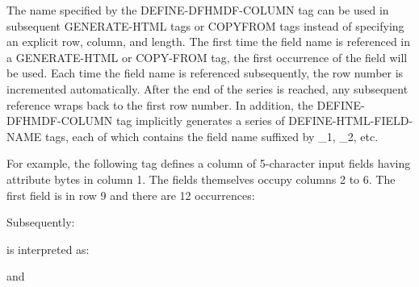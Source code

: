 \documentclass[letterpaper,10pt,english]{sphinxmanual}
\begin{document}
The name specified by the DEFINE-DFHMDF-COLUMN tag can be used in subsequent GENERATE-HTML tags or COPYFROM
tags instead of specifying an explicit row, column, and length. The first time the field name is referenced in a
GENERATE-HTML or COPY-FROM tag, the first occurrence of the field will be used. Each time the field name is
referenced subsequently, the row number is incremented automatically. After the end of the series is reached, any
subsequent reference wraps back to the first row number. In addition, the DEFINE-DFHMDF-COLUMN tag implicitly
generates a series of DEFINE-HTML-FIELD-NAME tags, each of which contains the field name suffixed by \_1, \_2, etc.

For example, the following tag defines a column of 5-character input fields having attribute bytes in column 1. The
fields themselves occupy columns 2 to 6. The first field is in row 9 and there are 12 occurrences:

\begin{sphinxVerbatim}[commandchars=\\\{\}]
   
\end{sphinxVerbatim}

Subsequently:

\begin{sphinxVerbatim}[commandchars=\\\{\}]
   
\end{sphinxVerbatim}

is interpreted as:

\begin{sphinxVerbatim}[commandchars=\\\{\}]
   
\end{sphinxVerbatim}

and
\end{document}
